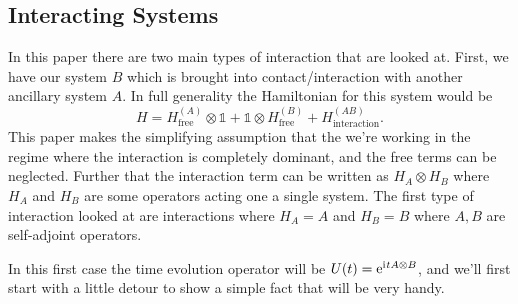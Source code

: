 \documentclass[11pt,english]{article}
\theoremstyle{definition}
\newcommand{\iu}{\mathrm{i}\mkern1mu}
\newcommand{\e}{\mathrm{e}}
\begin{document}
\subsection{Interacting Systems}
In this paper there are two main types of interaction that are looked at. First, we have our system $B$ which is brought into contact/interaction with another ancillary system $A$. In full generality the Hamiltonian for this system would be
\begin{equation*}
	H = H^{(A)}_\text{free}\otimes\mathbb{1} + \mathbb{1}\otimes H^{(B)}_\text{free} + H^{(AB)}_\text{interaction}.
\end{equation*}
This paper makes the simplifying assumption that the we're working in the regime where the interaction is completely dominant, and the free terms can be neglected. Further that the interaction term can be written as $H_A\otimes H_B$ where $H_A$ and $H_B$ are some operators acting one a single system. The first type of interaction looked at are interactions where $H_A = A$ and $H_B = B$ where $A, B$ are self-adjoint operators.

In this first case the time evolution operator will be $U(t) = \e^{\iu tA\otimes B}$, and we'll first start with a little detour to show a simple fact that will be very handy.
\end{document}
